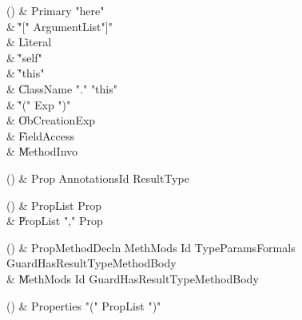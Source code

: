 \begin{bbgrammarappendix}{4.3in}

() & Primary \label{prod:Primary}  \: \xcd"here"  \\

 &    \| \xcd"[" ArgumentList\opt \xcd"]" \\
 &    \| Literal \\
 &    \| \xcd"self" \\
 &    \| \xcd"this" \\
 &    \| ClassName \xcd"." \xcd"this" \\
 &    \| \xcd"(" Exp \xcd")" \\
 &    \| ObCreationExp \\
 &    \| FieldAccess \\
 &    \| MethodInvo \\

\end{bbgrammarappendix}

\begin{bbgrammarappendix}{4.6in}

() & Prop \label{prod:Prop}  \: Annotations\opt Id ResultType  \\


\end{bbgrammarappendix}

\begin{bbgrammarappendix}{4.2in}

() & PropList \label{prod:PropList}  \: Prop  \\

 &    \| PropList \xcd"," Prop \\

\end{bbgrammarappendix}

\begin{bbgrammarappendix}{3.5in}

() & PropMethodDecln \label{prod:PropMethodDecln}  \: MethMods Id TypeParams\opt Formals Guard\opt HasResultType\opt MethodBody  \\

 &    \| MethMods Id Guard\opt HasResultType\opt MethodBody \\

\end{bbgrammarappendix}

\begin{bbgrammarappendix}{4.0in}

() & Properties \label{prod:Properties}  \: \xcd"(" PropList \xcd")"  \\


\end{bbgrammarappendix}

